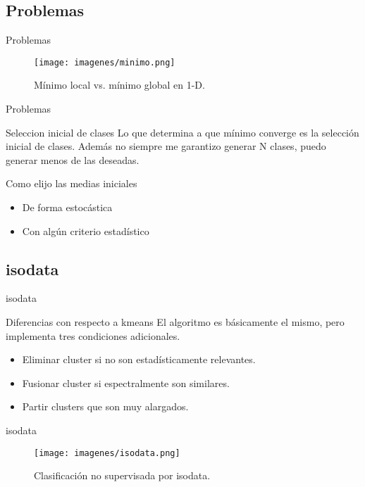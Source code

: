\documentclass[handout]{beamer}
\begin{document}
\subsection{Problemas}

\begin{frame}{Problemas}
  \begin{figure}
    \texttt{[image: imagenes/minimo.png]}
    \caption{M\'inimo local vs. m\'inimo global en 1-D.}
  \end{figure}
\end{frame}

\begin{frame}{Problemas}
  \begin{alertblock}{Seleccion inicial de clases}
    Lo que determina a que m\'inimo converge es la selección inicial de clases. Además no siempre me garantizo generar N clases, puedo generar menos de las deseadas.
  \end{alertblock}\pause
  \begin{block}{Como elijo las medias iniciales}
    \begin{itemize}[<+>]
      \item De forma estocástica
      \item Con algún criterio estad\'istico
    \end{itemize}
  \end{block}
\end{frame}

\subsection{isodata}

\begin{frame}{isodata}
  \begin{block}{Diferencias con respecto a kmeans}
    El algoritmo es básicamente el mismo, pero implementa tres condiciones adicionales.
    \begin{itemize}[<+>]
      \item Eliminar cluster si no son estad\'isticamente relevantes.
      \item Fusionar cluster si espectralmente son similares.
      \item Partir clusters que son muy alargados.
    \end{itemize}
  \end{block}
\end{frame}

\begin{frame}{isodata}
  \begin{figure}
    \texttt{[image: imagenes/isodata.png]}
    \caption{Clasificación no supervisada por isodata.}
  \end{figure}
\end{frame}
\end{document}
